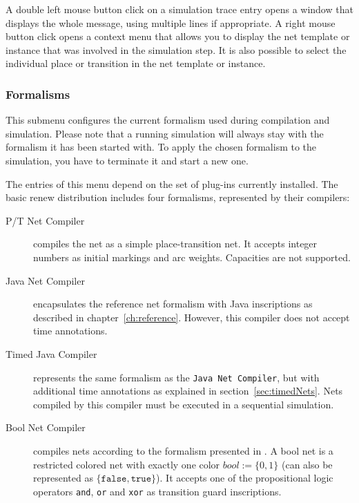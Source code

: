 A double left mouse button click on a simulation trace entry opens a window
that displays the whole message, using multiple lines if appropriate.  
A right mouse button click opens a context menu that allows you to display
the net template or instance that was involved in the simulation step.
It is also possible to select the individual place or
transition in the net template or instance.


\subsubsection{Formalisms}
\label{subsec:formalismgui}

This submenu configures the current formalism
used during compilation and simulation.
Please note that a running simulation will always stay with the
formalism it has been started with.
To apply the chosen formalism to the simulation, you have to
terminate it and start a new one.

The entries of this menu depend on the set of plug-ins currently installed.
The basic renew distribution includes four formalisms, represented by their
compilers:
\begin{description}
\item[P/T Net Compiler] compiles the net as a simple place-transition net.
  It accepts integer numbers as initial markings and arc weights.
  Capacities are not supported.
\item[Java Net Compiler] encapsulates the reference net formalism with Java
  inscriptions as described in chapter~\ref{ch:reference}.
  However, this compiler does not accept time annotations.
\item[Timed Java Compiler] represents the same formalism as the
  \texttt{Java Net Compiler}, but with additional time annotations as
  explained in section~\ref{sec:timedNets}.
  Nets compiled by this compiler must be executed in a sequential
  simulation.
\item[Bool Net Compiler] compiles nets according to the formalism presented
  in \cite{Langner1998}.
  A bool net is a restricted colored net with exactly one color
  $bool:=\{0, 1\}$ (can also be represented as $\{\mathtt{false},
  \mathtt{true}\}$).
  It accepts one of the propositional logic operators \texttt{and},
  \texttt{or} and \texttt{xor} as transition guard inscriptions.
\end{description}

